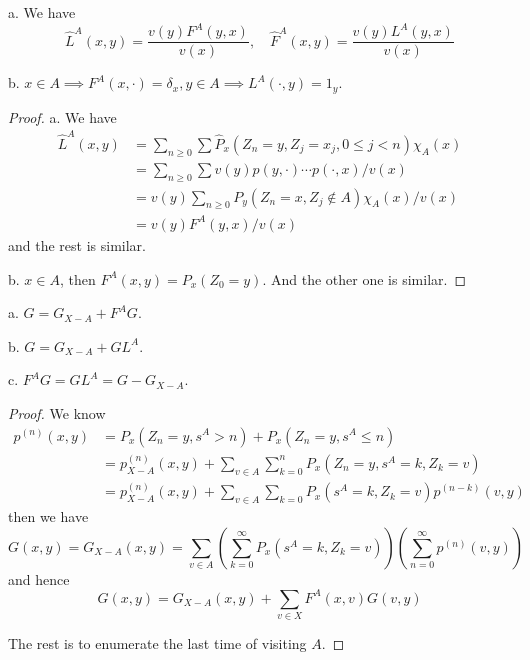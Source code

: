\documentclass[lang=en, color=blue, ]{elegantbook}
\begin{document}
\begin{proposition}
    a. We have
    \[
    \hat{L}^A(x,y) = \dfrac{v(y)F^A(y,x)}{v(x)},\quad \hat{F}^A(x,y) = \dfrac{v(y)L^A(y,x)}{v(x)}
    \]\par
    b. $x\in A \implies F^A(x,\cdot) = \delta_x, y\in A \implies L^A(\cdot,y) = 1_y$.
\end{proposition}
\begin{proof}
    a. We have
    \[
    \begin{aligned}
        \hat{L}^A(x,y) &= \sum\limits_{n\geq 0}\sum \hat{P}_x(Z_n = y, Z_j = x_j, 0\leq j < n)\chi_A(x) \\
        &= \sum\limits_{n\geq 0}\sum v(y)p(y,\cdot)\cdots p(\cdot,x)/v(x) \\
        &= v(y)\sum\limits_{n\geq 0}P_y(Z_n=x,Z_j\notin A)\chi_A(x)/v(x) \\
        &= v(y)F^A(y,x)/v(x)
    \end{aligned} 
    \]
    and the rest is similar.\par
    b. $x\in A$, then $F^A(x,y) = P_x(Z_0 = y)$. And the other one is similar.
\end{proof}

\begin{lemma}
    a. $G = G_{X-A}+F^AG$.\par
    b. $G = G_{X-A} + GL^A$.\par
    c. $F^AG = GL^A  = G-G_{X-A}$.
\end{lemma}
\begin{proof}
    We know
    \[
    \begin{aligned}
    p^{(n)}(x,y) &= P_x(Z_n = y, s^A>n)+P_x(Z_n = y, s^A \leq n)\\
    &= p_{X-A}^{(n)}(x,y) + \sum_{v\in A}\sum\limits_{k=0}^n P_x(Z_n = y, s^A = k, Z_k = v) \\
    & = p_{X-A}^{(n)}(x,y) + \sum_{v\in A}\sum\limits_{k=0}P_x(s^A = k,Z_k = v)p^{(n-k)}(v,y)
    \end{aligned}
    \]
    then we have
    \[
    G(x,y) = G_{X-A}(x,y) = \sum\limits_{v\in A}(\sum\limits_{k=0}^{\infty}P_x(s^A = k, Z_k = v))(\sum\limits_{n=0}^{\infty} p^{(n)}(v,y))
    \]
    and hence
    \[
    G(x,y) = G_{X-A}(x,y) + \sum\limits_{v\in X}F^A(x,v)G(v,y)
    \]\par 
    The rest is to enumerate the last time of visiting $A$.
\end{proof}
\end{document}
